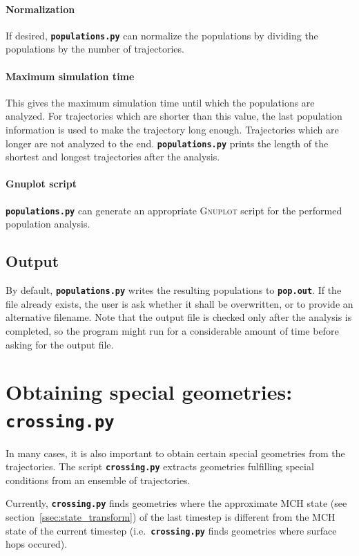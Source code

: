 \documentclass[a4paper,11pt,DIV=15,openany,twoside=false]{scrbook}
\newcommand{\ttt}[1]{\textbf{\texttt{#1}}}
\begin{document}
\paragraph{Normalization}

If desired, \ttt{populations.py} can normalize the populations by dividing the populations by the number of trajectories. 

\paragraph{Maximum simulation time}

This gives the maximum simulation time until which the populations are analyzed. For trajectories which are shorter than this value, the last population information is used to make the trajectory long enough. Trajectories which are longer are not analyzed to the end. \ttt{populations.py} prints the length of the shortest and longest trajectories after the analysis.

\paragraph{Gnuplot script}

\ttt{populations.py} can generate an appropriate \textsc{Gnuplot} script for the performed population analysis. 

\subsection{Output}

By default, \ttt{populations.py} writes the resulting populations to \ttt{pop.out}. If the file already exists, the user is ask whether it shall be overwritten, or to provide an alternative filename. Note that the output file is checked only after the analysis is completed, so the program might run for a considerable amount of time before asking for the output file.


\section{Obtaining special geometries: \ttt{crossing.py}}\label{sec:crossing.py}

In many cases, it is also important to obtain certain special geometries from the trajectories. The script \ttt{crossing.py} extracts geometries fulfilling special conditions from an ensemble of trajectories. 

Currently, \ttt{crossing.py} finds geometries where the approximate MCH state (see section~\ref{ssec:state_transform}) of the last timestep is different from the MCH state of the current timestep (i.e.\ \ttt{crossing.py} finds geometries where surface hops occured). 
\end{document}
